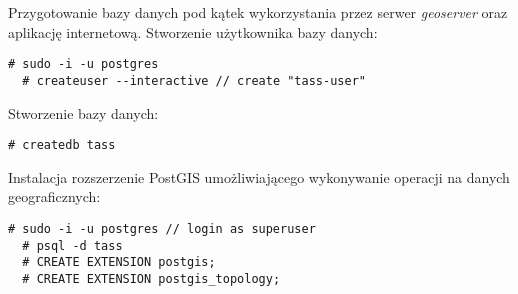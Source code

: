 \documentclass[10pt,a4paper]{article}
\begin{document}
\bigskip
Przygotowanie bazy danych pod kątek wykorzystania przez serwer \textit{geoserver} oraz aplikację internetową. Stworzenie użytkownika bazy danych:
\begin{lstlisting}[style=BashInputStyle]
  # sudo -i -u postgres
  # createuser --interactive // create "tass-user"
\end{lstlisting}

\bigskip
Stworzenie bazy danych:
\begin{lstlisting}[style=BashInputStyle]
  # createdb tass
\end{lstlisting}

\bigskip
Instalacja rozszerzenie PostGIS umożliwiającego wykonywanie operacji na danych geograficznych:
\begin{lstlisting}[style=BashInputStyle]
  # sudo -i -u postgres // login as superuser
  # psql -d tass
  # CREATE EXTENSION postgis;
  # CREATE EXTENSION postgis_topology;
\end{lstlisting}
\end{document}
